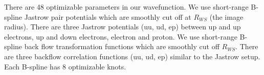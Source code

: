 There are 48 optimizable parameters in our wavefunction. We use short-range B-spline Jastrow pair potentials which are smoothly cut off at $R_{WS}$ (the image radius). There are three Jastrow potentials (uu, ud, ep) between up and up electrons, up and down electrons, electron and proton. We use short-range B-spline back flow transformation functions which are smoothly cut off $R_{WS}$. There are three backflow correlation functions (uu, ud, ep) similar to the Jastrow setup. Each B-spline has 8 optimizable knots.
\begin{comment}
\subsection{QMC Data}

At each density, we perform one VMC and two DMC calculations. Each QMC calculation is labeled by a series index. The VMC calculation is series 0. The first DMC calculation with a relatively large time step is series 1. The second DMC calculation with a relatively small time step is series 2. We post-process the raw results (series 0 - 2) to produce series 3 and 4. We linearly extrapolate the DMC results (series 1, 2) to zero time step and label the results series 3. We linearly extrapolate the VMC and the t=0 DMC results (series 0, 3) to obtain pure-estimator kinetic and potential energies and label them series 4.

Twist-average QMC energies are displayed in the following table. The dUlr column contains the many-body finite size correction which will be described in the next section.

\begin{table}[h]
\small

\caption{Cmca-4}
\end{table}

\begin{table}[h]
\small

\caption{Cmca-12}
\end{table}

\begin{table}[h]
\small

\caption{C2/c-24}
\end{table}

\begin{table}[h]
\small

\caption{I4$_1$/amd}
\end{table}

\subsection{Many-body Finite Size Correction}


\end{comment}
